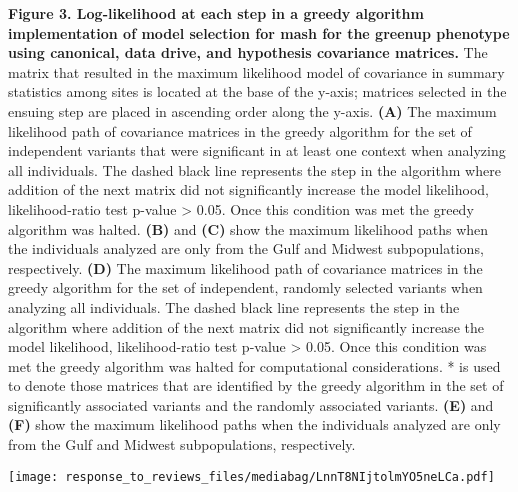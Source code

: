 \documentclass[
  letterpaper,
  DIV=11,
  numbers=noendperiod]{scrartcl}
\begin{document}
\textbf{Figure 3. Log-likelihood at each step in a greedy algorithm
implementation of model selection for mash for the greenup phenotype
using canonical, data drive, and hypothesis covariance matrices.} The
matrix that resulted in the maximum likelihood model of covariance in
summary statistics among sites is located at the base of the y-axis;
matrices selected in the ensuing step are placed in ascending order
along the y-axis. \textbf{(A)} The maximum likelihood path of covariance
matrices in the greedy algorithm for the set of independent variants
that were significant in at least one context when analyzing all
individuals. The dashed black line represents the step in the algorithm
where addition of the next matrix did not significantly increase the
model likelihood, likelihood-ratio test p-value \textgreater{} 0.05.
Once this condition was met the greedy algorithm was halted.
\textbf{(B)} and \textbf{(C)} show the maximum likelihood paths when the
individuals analyzed are only from the Gulf and Midwest subpopulations,
respectively. \textbf{(D)} The maximum likelihood path of covariance
matrices in the greedy algorithm for the set of independent, randomly
selected variants when analyzing all individuals. The dashed black line
represents the step in the algorithm where addition of the next matrix
did not significantly increase the model likelihood, likelihood-ratio
test p-value \textgreater{} 0.05. Once this condition was met the greedy
algorithm was halted for computational considerations. * is used to
denote those matrices that are identified by the greedy algorithm in the
set of significantly associated variants and the randomly associated
variants. \textbf{(E)} and \textbf{(F)} show the maximum likelihood
paths when the individuals analyzed are only from the Gulf and Midwest
subpopulations, respectively.

\hfill\break

\texttt{[image: response\_to\_reviews\_files/mediabag/LnnT8NIjtolmYO5neLCa.pdf]}
\end{document}
